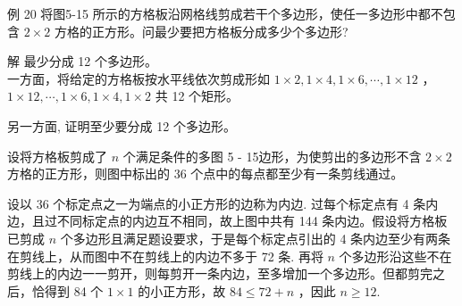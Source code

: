 \documentclass[10pt]{article}
\begin{document}
例 20 将图5-15 所示的方格板沿网格线剪成若干个多边形，使任一多边形中都不包含 $2 \times 2$ 方格的正方形。问最少要把方格板分成多少个多边形?

解 最少分成 12 个多边形。\\
一方面，将给定的方格板按水平线依次剪成形如 $1 \times 2,1 \times 4,1 \times 6, \cdots, 1 \times 12$ ， $1 \times 12, \cdots, 1 \times 6,1 \times 4,1 \times 2$ 共 12 个矩形。

另一方面, 证明至少要分成 12 个多边形。

设将方格板剪成了 $n$ 个满足条件的多图 5 - 15边形，为使剪出的多边形不含 $2 \times 2$ 方格的正方形，则图中标出的 36 个点中的每点都至少有一条剪线通过。

设以 36 个标定点之一为端点的小正方形的边称为内边. 过每个标定点有 4 条内边，且过不同标定点的内边互不相同，故上图中共有 144 条内边。假设将方格板已剪成 $n$ 个多边形且满足题设要求，于是每个标定点引出的 4 条内边至少有两条在剪线上，从而图中不在剪线上的内边不多于 72 条. 再将 $n$ 个多边形沿这些不在剪线上的内边一一剪开，则每剪开一条内边，至多增加一个多边形。但都剪完之后，恰得到 84 个 $1 \times 1$ 的小正方形，故 $84 \leqslant 72+n$ ，因此 $n \geqslant 12$.
\end{document}
